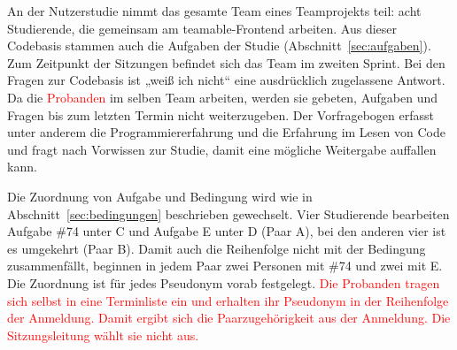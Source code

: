 
An der Nutzerstudie nimmt das gesamte Team eines Teamprojekts teil: acht Studierende, die gemeinsam am teamable-Frontend arbeiten. Aus dieser Codebasis stammen auch die Aufgaben der Studie (Abschnitt~\ref{sec:aufgaben}). Zum Zeitpunkt der Sitzungen befindet sich das Team im zweiten Sprint. Bei den Fragen zur Codebasis ist „weiß ich nicht“ eine ausdrücklich zugelassene Antwort. Da die \textcolor{red}{Probanden} im selben Team arbeiten, werden sie gebeten, Aufgaben und Fragen bis zum letzten Termin nicht weiterzugeben. Der Vorfragebogen erfasst unter anderem die Programmiererfahrung und die Erfahrung im Lesen von Code und fragt nach Vorwissen zur Studie, damit eine mögliche Weitergabe auffallen kann.

Die Zuordnung von Aufgabe und Bedingung wird wie in Abschnitt~\ref{sec:bedingungen} beschrieben gewechselt. Vier Studierende bearbeiten Aufgabe \#74 unter C und Aufgabe E unter D (Paar A), bei den anderen vier ist es umgekehrt (Paar B). Damit auch die Reihenfolge nicht mit der Bedingung zusammenfällt, beginnen in jedem Paar zwei Personen mit \#74 und zwei mit E. Die Zuordnung ist für jedes Pseudonym vorab festgelegt. \textcolor{red}{Die Probanden tragen sich selbst in eine Terminliste ein und erhalten ihr Pseudonym in der Reihenfolge der Anmeldung. Damit ergibt sich die Paarzugehörigkeit aus der Anmeldung. Die Sitzungsleitung wählt sie nicht aus.}%

